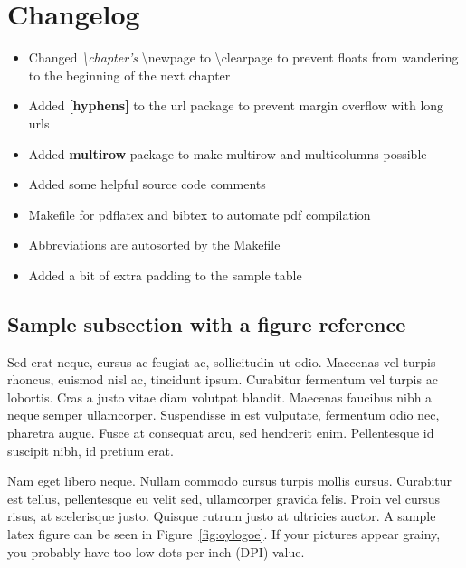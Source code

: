 \section{Changelog}

\begin{itemize}
\item Changed \textit{\textbackslash{chapter's}} \textbackslash{newpage} to 
\textbackslash{clearpage} to prevent floats from wandering to the beginning of the next chapter

\item Added \textbf{[hyphens]} to the url package to prevent margin overflow with 
long urls

\item Added \textbf{multirow} package to make multirow and multicolumns possible

\item Added some helpful source code comments

\item Makefile for pdflatex and bibtex to automate pdf compilation

\item Abbreviations are autosorted by the Makefile

\item Added a bit of extra padding to the sample table
\end{itemize}

\subsection{Sample subsection with a figure reference}

Sed erat neque, cursus ac feugiat ac, sollicitudin
ut odio. Maecenas vel turpis rhoncus, euismod nisl ac, tincidunt ipsum. Curabitur fermentum vel
turpis ac lobortis. Cras a justo vitae diam volutpat blandit. Maecenas faucibus nibh a neque 
semper ullamcorper. Suspendisse in est vulputate, fermentum odio nec, pharetra augue. Fusce at
consequat arcu, sed hendrerit enim. Pellentesque id suscipit nibh, id pretium erat. 

Nam eget libero neque. Nullam commodo cursus turpis mollis cursus. Curabitur est tellus,
pellentesque eu velit sed, ullamcorper gravida felis. Proin vel cursus risus, at scelerisque 
justo. Quisque rutrum justo at ultricies auctor. A sample latex figure can be seen in
Figure~\ref{fig:oylogoe}. If your pictures appear grainy, you probably have too low dots
per inch (DPI) value.

